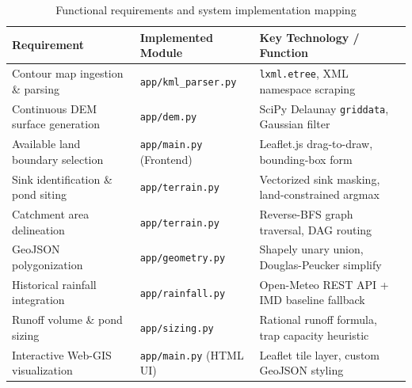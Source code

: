 \documentclass[manuscript,screen]{acmart}
\begin{document}
\begin{table}[h]
  \caption{Functional requirements and system implementation mapping}
  \label{tab:requirements}
  \begin{tabular}{p{5.2cm}p{3.5cm}p{4.5cm}}
    \toprule
    Requirement & Implemented Module & Key Technology / Function \\
    \midrule
    Contour map ingestion \& parsing & \texttt{app/kml\_parser.py} & \texttt{lxml.etree}, XML namespace scraping \\
    Continuous DEM surface generation & \texttt{app/dem.py} & SciPy Delaunay \texttt{griddata}, Gaussian filter \\
    Available land boundary selection & \texttt{app/main.py} (Frontend) & Leaflet.js drag-to-draw, bounding-box form \\
    Sink identification \& pond siting & \texttt{app/terrain.py} & Vectorized sink masking, land-constrained argmax \\
    Catchment area delineation & \texttt{app/terrain.py} & Reverse-BFS graph traversal, DAG routing \\
    GeoJSON polygonization & \texttt{app/geometry.py} & Shapely unary union, Douglas-Peucker simplify \\
    Historical rainfall integration & \texttt{app/rainfall.py} & Open-Meteo REST API + IMD baseline fallback \\
    Runoff volume \& pond sizing & \texttt{app/sizing.py} & Rational runoff formula, trap capacity heuristic \\
    Interactive Web-GIS visualization & \texttt{app/main.py} (HTML UI) & Leaflet tile layer, custom GeoJSON styling \\
    \bottomrule
  \end{tabular}
\end{table}
\end{document}
